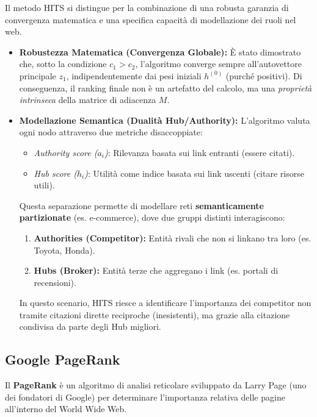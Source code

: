 Il metodo HITS si distingue per la combinazione di una robusta garanzia di convergenza matematica e una specifica capacità di modellazione dei ruoli nel web.

\begin{itemize}
    \item \textbf{Robustezza Matematica (Convergenza Globale):}
    È stato dimostrato che, sotto la condizione $c_1 > c_2$, l'algoritmo converge sempre all'autovettore principale $z_1$, indipendentemente dai pesi iniziali $h^{(0)}$ (purché positivi). Di conseguenza, il ranking finale non è un artefatto del calcolo, ma una \textit{proprietà intrinseca} della matrice di adiacenza $M$.

    \item \textbf{Modellazione Semantica (Dualità Hub/Authority):}
    L'algoritmo valuta ogni nodo attraverso due metriche disaccoppiate:
    \begin{itemize}
        \item \textit{Authority score ($a_i$)}: Rilevanza basata sui link entranti (essere citati).
        \item \textit{Hub score ($h_i$)}: Utilità come indice basata sui link uscenti (citare risorse utili).
    \end{itemize}
    Questa separazione permette di modellare reti \textbf{semanticamente partizionate} (es. e-commerce), dove due gruppi distinti interagiscono:
    \begin{enumerate}
        \item \textbf{Authorities (Competitor):} Entità rivali che non si linkano tra loro (es. Toyota, Honda).
        \item \textbf{Hubs (Broker):} Entità terze che aggregano i link (es. portali di recensioni).
    \end{enumerate}
    In questo scenario, HITS riesce a identificare l'importanza dei competitor non tramite citazioni dirette reciproche (inesistenti), ma grazie alla citazione condivisa da parte degli Hub migliori.
\end{itemize}

\newpage
\subsection{Google PageRank}

Il \textbf{PageRank} è un algoritmo di analisi reticolare sviluppato da Larry Page (uno dei fondatori di Google) per determinare l'importanza relativa delle pagine all'interno del World Wide Web.


